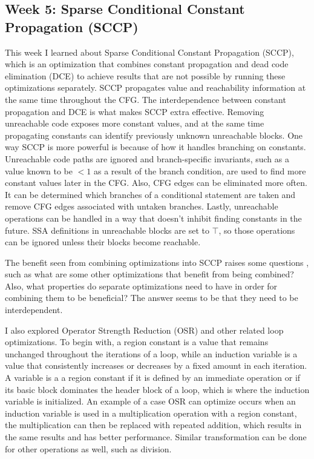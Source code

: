 \documentclass[11pt, a4paper, titlepage]{article}
\begin{document}
\subsection{Week 5: Sparse Conditional Constant Propagation (SCCP)}

This week I learned about Sparse Conditional Constant Propagation (SCCP),
which is an optimization that combines constant propagation and dead code elimination (DCE) to achieve results that are not possible by running these optimizations separately.
SCCP propagates value and reachability information at the same time throughout the CFG.
The interdependence between constant propagation and DCE is what makes SCCP extra effective.
Removing unreachable code exposes more constant values, and at the same time propagating constants can identify previously unknown unreachable blocks.
One way SCCP is more powerful is because of how it handles branching on constants.
Unreachable code paths are ignored and branch-specific invariants, such as a value known to be $<1$ as a result of the branch condition,
are used to find more constant values later in the CFG. Also, CFG edges can be eliminated more often.
It can be determined which branches of a conditional statement are taken and remove CFG edges associated with untaken branches.
Lastly, unreachable operations can be handled in a way that doesn't inhibit finding constants in the future.
SSA definitions in unreachable blocks are set to $\top$, so those operations can be ignored unless their blocks become reachable.

The benefit seen from combining optimizations into SCCP raises some questions , such as what are some other optimizations that benefit from being combined? Also, what properties do separate optimizations need to have in order for combining them to be beneficial? The answer seems to be that they need to be interdependent.

I also explored Operator Strength Reduction (OSR) and other related loop optimizations. To begin with, a region constant is a value that remains unchanged throughout the iterations of a loop, while an induction variable is a value that consistently increases or decreases by a fixed amount in each iteration. A variable is a a region constant if it is defined by an immediate operation or if its basic block dominates the header block of a loop, which is where the induction variable is initialized. An example of a case OSR can optimize occurs when an induction variable is used in a multiplication operation with a region constant, the multiplication can then be replaced with repeated addition, which results in the same results and has better performance. Similar transformation can be done for other operations as well, such as division.
\end{document}
